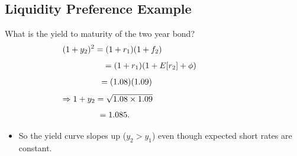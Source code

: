 \documentclass[letterpaper,10pt,english]{sphinxmanual}
\begin{document}
\subsection{Liquidity Preference Example}
\label{termStructure:id9}
What is the yield to maturity of the two year bond?
\begin{gather}
\begin{split}(1+y_2)^2 & = (1+r_1)(1+f_2) \hspace{1.25in}\end{split}\notag
\end{gather}\begin{gather}
\begin{split}& = (1+r_1)(1+E[r_2]+\phi)\end{split}\notag
\end{gather}\begin{gather}
\begin{split}& = (1.08)(1.09) \hspace{0.8in}\end{split}\notag
\end{gather}\begin{gather}
\begin{split}\Rightarrow 1+y_2 & = \sqrt{1.08 \times 1.09} \hspace{1.4in}\end{split}\notag
\end{gather}\begin{gather}
\begin{split}& = 1.085. \hspace{1.2in}\end{split}\notag
\end{gather}\begin{itemize}
\item {} 
So the yield curve slopes up ($y_2 > y_1$) even though
expected short rates are constant.

\end{itemize}
\end{document}
